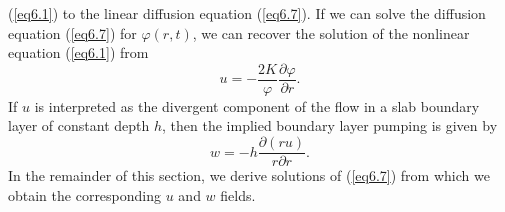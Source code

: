 \documentclass[10pt]{article}
\begin{document}
(\ref{eq6.1}) to the linear diffusion equation (\ref{eq6.7}). If we can solve the diffusion
equation (\ref{eq6.7}) for $\varphi(r,t)$, we can recover the solution of the nonlinear
equation (\ref{eq6.1}) from
\begin{equation}                                 %
     u = -\frac{2K}{\varphi} \frac{\partial\varphi}{\partial r}.
\label{eq6.8}
\end{equation}
If $u$ is interpreted as the divergent component of the flow in a slab boundary
layer of constant depth $h$, then the implied boundary layer pumping is given by
\begin{equation}                                 %
     w = -h\frac{\partial(ru)}{r\partial r}.
\label{eq6.9}
\end{equation}
In the remainder of this section, we derive solutions of (\ref{eq6.7}) from
which we obtain the corresponding $u$ and $w$ fields.
\end{document}
